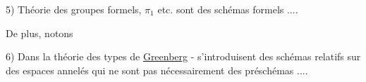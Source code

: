5) Théorie des groupes formels,  $\pi_1$ etc.  sont  des schémas formels ....

De plus, notons

6) Dans la théorie des types de \uline{Greenberg} - \uline{} s'introduisent des schémas relatifs sur des espaces annelés qui ne sont pas nécessairement des préschémas ....
